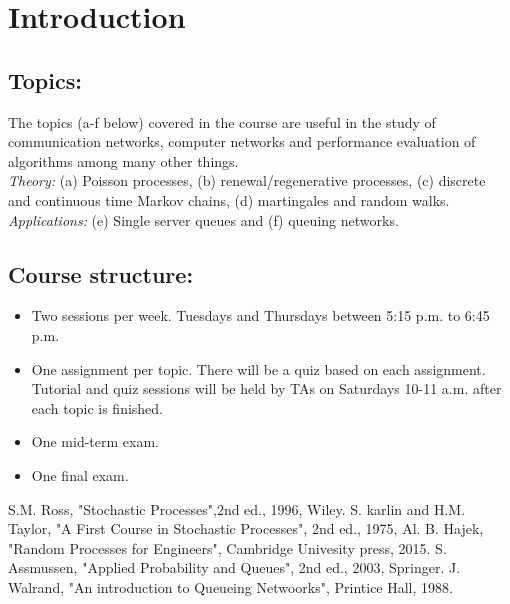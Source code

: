 \documentclass[all-lectures.tex]{subfiles}
\begin{document}
\maketitle
\chapter*{Introduction}
\section*{Topics:} 
The topics (a-f below) covered in the course are useful in the study of communication networks, computer networks and performance evaluation of algorithms among many other things. \\

\textit{Theory:} (a) Poisson processes, (b) renewal/regenerative processes, (c) discrete and continuous time Markov chains, (d) martingales and random walks. \\
\indent \textit{Applications:} (e) Single server  queues and (f) queuing networks. \\
\section*{Course structure:}
\begin{itemize}
\item Two sessions per week. Tuesdays and Thursdays between 5:15 p.m. to 6:45 p.m.
\item One assignment per topic. There will be a quiz based on each assignment. Tutorial and quiz sessions will be held by TAs on Saturdays 10-11 a.m. after each topic is finished.
\item One mid-term exam.
\item One final exam.
\end{itemize}

\begin{thebibliography}{1}
\bibitem{} S.M. Ross, "Stochastic Processes",2nd ed., 1996, Wiley.
\bibitem{} S. karlin and H.M. Taylor, "A First Course in Stochastic Processes", 2nd ed., 1975, Al. 
\bibitem{} B. Hajek, "Random Processes for Engineers", Cambridge Univesity press, 2015.
\bibitem{} S. Assmussen, "Applied Probability and Queues", 2nd ed., 2003, Springer. 
\bibitem{} J. Walrand, "An introduction to Queueing Netwoorks", Printice Hall, 1988.
\end{thebibliography}
\end{document}
